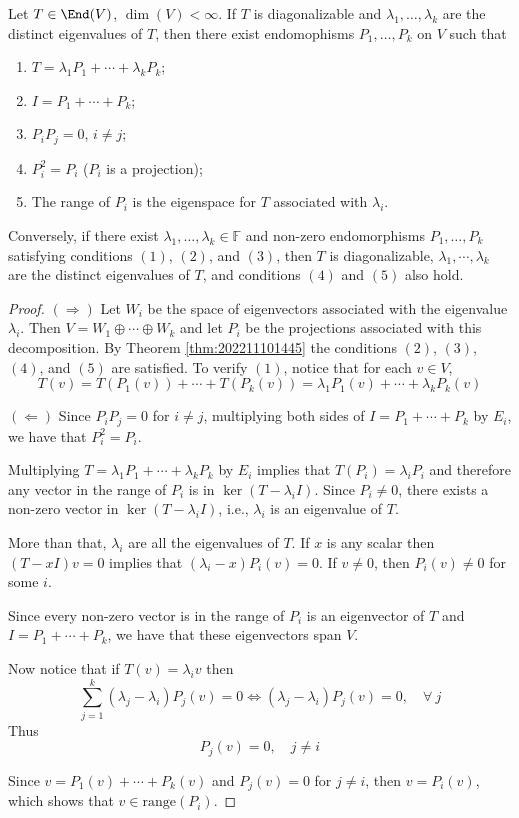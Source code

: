 \begin{theorem}
	Let $T \in \End(V)$, $\dim(V) < \infty$. If $T$ is diagonalizable and $\lambda_1, \ldots, \lambda_k$ are the distinct eigenvalues of $T$, then there exist endomophisms $P_1, \ldots, P_k$ on $V$ such that
	\begin{enumerate}
		\item $T = \lambda_1 P_1 + \cdots + \lambda_k P_k$;
		\item $I = P_1 + \cdots + P_k$;
		\item $P_i P_j = 0$, $i \neq j$;
		\item $P_i^2 = P_i$ ($P_i$ is a projection);
		\item The range of $P_i$ is the eigenspace for $T$ associated with $\lambda_i$.
	\end{enumerate}

	Conversely, if there exist $\lambda_1, \ldots, \lambda_k \in \mathbb{F}$ and non-zero endomorphisms $P_1, \ldots, P_k$ satisfying conditions $(1)$, $(2)$, and $(3)$, then $T$ is diagonalizable, $\lambda_1, \cdots, \lambda_k$ are the distinct eigenvalues of $T$, and conditions $(4)$ and $(5)$ also hold.
\end{theorem}

\begin{proof}
	$(\Rightarrow)$ Let $W_i$ be the space of eigenvectors associated with the eigenvalue $\lambda_i$. Then $V = W_1 \oplus \cdots \oplus W_k$ and let $P_i$ be the projections associated with this decomposition. By Theorem \ref{thm:202211101445} the conditions $(2)$, $(3)$, $(4)$, and $(5)$ are satisfied. To verify $(1)$, notice that for each $v \in V$,
	\[
		T(v) = T(P_1(v)) + \cdots + T(P_k(v)) = \lambda_1 P_1(v) + \cdots + \lambda_k P_k(v)
	\]

	$(\Leftarrow)$ Since $P_i P_j = 0$ for $i \neq j$, multiplying both sides of $I = P_1 + \cdots + P_k$ by $E_i$, we have that $P_i^2 = P_i$. 

	Multiplying $T = \lambda_1 P_1 + \cdots + \lambda_k P_k$ by $E_i$ implies that $T(P_i) = \lambda_i P_i$ and therefore any vector in the range of $P_i$ is in $\ker (T - \lambda_i I)$. Since $P_i \neq 0$, there exists a non-zero vector in $\ker (T - \lambda_i I)$, i.e., $\lambda_i$ is an eigenvalue of $T$.
	
	More than that, $\lambda_i$ are all the eigenvalues of $T$. If $x$ is any scalar then $(T - xI)v = 0$ implies that $(\lambda_i - x)P_i(v) = 0$. If $v \neq 0$, then $P_i(v) \neq 0$ for some $i$. 
	
	Since every non-zero vector is in the range of $P_i$ is an eigenvector of $T$ and $I = P_1 + \cdots + P_k$, we have that these eigenvectors span $V$. 

	Now notice that if $T(v) = \lambda_i v$ then 
	\[
		\sum_{j=1}^k (\lambda_j - \lambda_i) P_j(v) = 0 \iff (\lambda_j - \lambda_i) P_j(v) = 0, \quad \forall~j
	\]
	Thus
	\[
		P_j(v) = 0, \quad j \neq i
	\]

	Since $v = P_1(v) + \cdots + P_k(v)$ and $P_j(v) = 0$ for $j \neq i$, then $v = P_i(v)$, which shows that $v \in \text{range}(P_i)$.
\end{proof}


